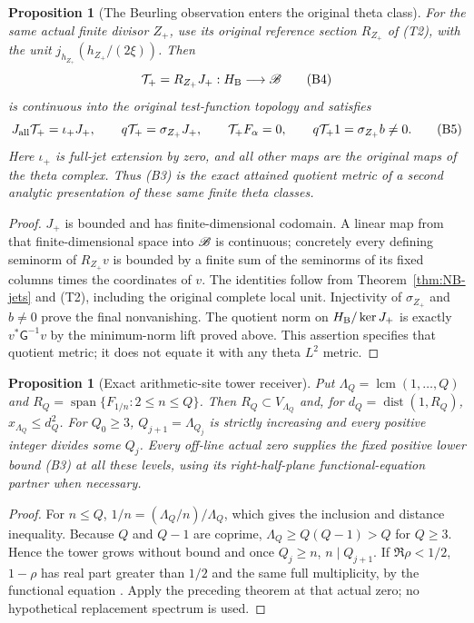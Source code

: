 \documentclass[11pt]{article}
\newtheorem{proposition}[theorem]{Proposition}
\begin{document}
\begin{proposition}[The Beurling observation enters the original theta class]
For the same actual finite divisor $Z_+$, use its original reference
section $R_{Z_+}$ of (T2), with the unit $j_{h_{Z_+}}(h_{Z_+}/(2\xi))$.
Then
\[
 \mathcal T_+=R_{Z_+}J_+:H_{\rm B}\longrightarrow\mathscr B
 \tag{B4}
\]
is continuous into the original test-function topology and satisfies
\[
 J_{\rm all}\mathcal T_+=\iota_+J_+,\qquad
 q\mathcal T_+=\sigma_{Z_+}J_+,\qquad
 \mathcal T_+F_\alpha=0,\qquad
 q\mathcal T_+1=\sigma_{Z_+}b\ne0.
 \tag{B5}
\]
Here $\iota_+$ is full-jet extension by zero, and all other maps are
the original maps of the theta complex. Thus (B3) is the exact attained
quotient metric of a second analytic presentation of these same finite
theta classes.
\end{proposition}
\begin{proof}
$J_+$ is bounded and has finite-dimensional codomain. A linear map
from that finite-dimensional space into $\mathscr B$ is continuous; concretely
every defining seminorm of $R_{Z_+}v$ is bounded by a finite sum of the
seminorms of its fixed columns times the coordinates of $v$.
The identities follow from Theorem~\ref{thm:NB-jets} and (T2), including
the original complete local unit. Injectivity of $\sigma_{Z_+}$ and
$b\ne0$ prove the final nonvanishing. The quotient norm on
$H_{\rm B}/\ker J_+$ is exactly $v^*\mathsf G^{-1}v$ by the
minimum-norm lift proved above. This assertion specifies that quotient
metric; it does not equate it with any theta $L^2$ metric.
\end{proof}

\begin{proposition}[Exact arithmetic-site tower receiver]\label{prop:tower}
Put $\Lambda_Q=\operatorname{lcm}(1,\ldots,Q)$ and
$R_Q=\operatorname{span}\{F_{1/n}:2\leq n\leq Q\}$.
Then $R_Q\subset V_{\Lambda_Q}$ and, for
$d_Q=\operatorname{dist}(1,R_Q)$, $x_{\Lambda_Q}\leq d_Q^2$.
For $Q_0\geq3$, $Q_{j+1}=\Lambda_{Q_j}$ is strictly increasing and
every positive integer divides some $Q_j$.
Every off-line actual zero supplies the fixed positive lower bound (B3)
at all these levels, using its right-half-plane functional-equation partner
when necessary.
\end{proposition}
\begin{proof}
For $n\leq Q$, $1/n=(\Lambda_Q/n)/\Lambda_Q$, which gives the
inclusion and distance inequality. Because $Q$ and $Q-1$ are coprime,
$\Lambda_Q\geq Q(Q-1)>Q$ for $Q\geq3$. Hence the tower grows without
bound and once $Q_j\geq n$, $n\mid Q_{j+1}$. If $\Re\rho<1/2$,
$1-\rho$ has real part greater than $1/2$ and the same full
multiplicity, by the functional equation \cite{cr:DLMF25}. Apply the preceding
theorem at that actual zero; no hypothetical replacement spectrum is used.
\end{proof}
\end{document}
